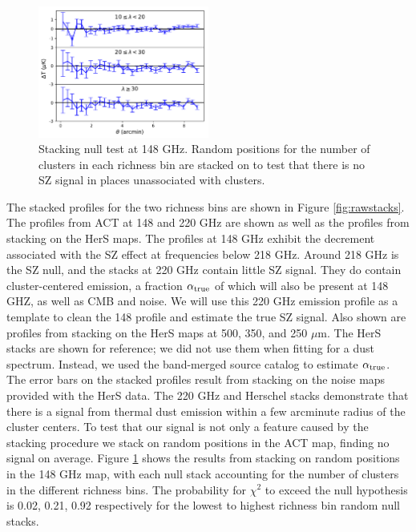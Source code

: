 \documentclass[a4paper,fleqn,usenatbib]{mnras}
\begin{document}
\begin{figure}
  \centering
  \includegraphics[width=0.5\textwidth]{rand_stacks_tophat.pdf}

\caption{Stacking null test at 148 GHz. Random positions for the number of clusters in each richness bin are stacked on to test that there is no SZ signal in places unassociated with clusters.}  
  \label{fig:randstacks}
\end{figure}




The stacked profiles for the two richness bins are shown in Figure \ref{fig:rawstacks}. The profiles from ACT at 148 and 220 GHz are shown as well as the profiles from stacking on the HerS maps. The profiles at 148 GHz exhibit the decrement associated with the SZ effect at frequencies below 218 GHz. Around 218 GHz is the SZ null, and the stacks at 220 GHz contain little SZ signal. They do contain cluster-centered emission, a fraction $\alpha_{\rm true}$ of which will also be present at 148 GHZ, as well as CMB and noise. We will use this 220 GHz emission profile as a template to clean the 148 profile and estimate the true SZ signal. Also shown are profiles from stacking on the HerS maps at 500, 350, and 250 $\mu$m. The HerS stacks are shown for reference; we did not use them when fitting for a dust spectrum. Instead, we used the band-merged source catalog \citep{2014ApJS..210...22V} to estimate $\alpha_{\rm true}$. The error bars on the stacked profiles result from stacking on the noise maps provided with the HerS data. The 220 GHz and Herschel stacks demonstrate that there is a signal from thermal dust emission within a few arcminute radius of the cluster centers.
To test that our signal is not only a feature caused by the stacking procedure we stack on random positions in the ACT map, finding no signal on average. Figure \ref{fig:randstacks} shows the results from stacking on random positions in the 148 GHz map, with each null stack accounting for the number of clusters in the different richness bins. The probability for $\chi^2$ to exceed the null hypothesis is 0.02, 0.21, 0.92 respectively for the lowest to highest richness bin random null stacks.
\end{document}
